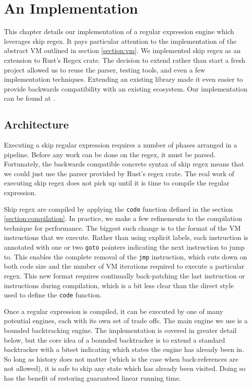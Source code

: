 \chapter{An Implementation}
\label{chapter:implementation}

This chapter details our implementation of a regular expression
engine which leverages skip regex. It pays particular attention
to the implementation of the abstract VM outlined in section
\ref{section:vm}. We implemented skip regex as
an extension to Rust's Regex crate. The decision to extend rather
than start a fresh project allowed us to reuse the parser,
testing tools, and even a few implementation techniques. Extending
an existing library made it even easier to provide backwards
compatibility with an existing ecosystem. Our implementation
can be found at \cite{PailesSkipRegex}.

\section{Architecture}

Executing a skip regular expression requires a number of phases
arranged in a pipeline. Before any work can be done on the regex,
it must be parsed. Fortunately, the backwards compatible concrete
syntax of skip regex means that we could just use the parser provided
by Rust's regex crate. The real work of executing skip regex does not
pick up until it is time to compile the regular expression.

Skip regex are compiled by applying the \verb'code' function defined
in the section \ref{section:compilation}. In practice, we make a
few refinements to the compilation technique for performance.
The biggest such change
is to the format of the VM instructions that we execute. Rather than
using explicit labels, each instruction is annotated with one or
two \verb'goto' pointers indicating the next instruction to jump to.
This enables the complete removal of the \verb'jmp' instruction, which
cuts down on both code size and the number of VM iterations required to execute
a particular regex. This new format requires continually back-patching
the last instruction or instructions during compilation, which is a bit
less clear than the direct style used to define the \verb'code' function.

Once a regular expression is compiled, it can be executed by one
of many potential engines, each with its own set of trade offs.
The main engine we use is a bounded backtracking engine. The
implementation is covered in greater detail below, but the core
idea of a bounded backtracker is to extend a standard backtracker
with a bitset indicating which states the engine has already
been in. So long as history does not matter (which is the case
when back-references are not allowed), it is safe to skip any
state which has already been visited. Doing so has the benefit
of restoring guaranteed linear running time.

